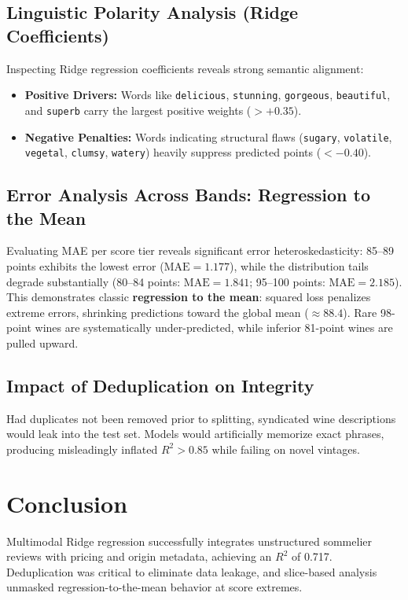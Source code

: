 \documentclass[conference]{IEEEtran}
\begin{document}
\subsection{Linguistic Polarity Analysis (Ridge Coefficients)}
Inspecting Ridge regression coefficients reveals strong semantic alignment:
\begin{itemize}
\item \textbf{Positive Drivers:} Words like \texttt{delicious}, \texttt{stunning}, \texttt{gorgeous}, \texttt{beautiful}, and \texttt{superb} carry the largest positive weights ($>+0.35$).
\item \textbf{Negative Penalties:} Words indicating structural flaws (\texttt{sugary}, \texttt{volatile}, \texttt{vegetal}, \texttt{clumsy}, \texttt{watery}) heavily suppress predicted points ($<-0.40$).
\end{itemize}

\subsection{Error Analysis Across Bands: Regression to the Mean}
Evaluating MAE per score tier reveals significant error heteroskedasticity: 85--89 points exhibits the lowest error ($\text{MAE}=1.177$), while the distribution tails degrade substantially (80--84 points: $\text{MAE}=1.841$; 95--100 points: $\text{MAE}=2.185$). This demonstrates classic \textbf{regression to the mean}: squared loss penalizes extreme errors, shrinking predictions toward the global mean ($\approx 88.4$). Rare 98-point wines are systematically under-predicted, while inferior 81-point wines are pulled upward.

\subsection{Impact of Deduplication on Integrity}
Had duplicates not been removed prior to splitting, syndicated wine descriptions would leak into the test set. Models would artificially memorize exact phrases, producing misleadingly inflated $R^2 > 0.85$ while failing on novel vintages.

\section{Conclusion}
Multimodal Ridge regression successfully integrates unstructured sommelier reviews with pricing and origin metadata, achieving an $R^2$ of 0.717. Deduplication was critical to eliminate data leakage, and slice-based analysis unmasked regression-to-the-mean behavior at score extremes.
\end{document}
